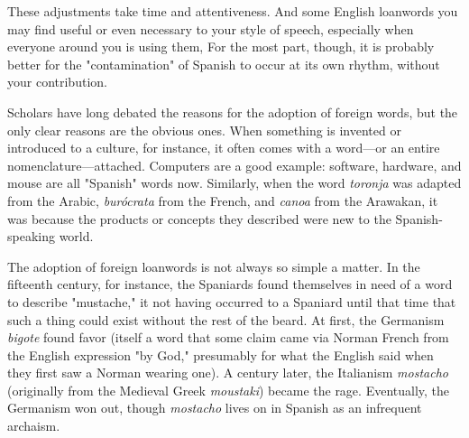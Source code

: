 These adjustments take time and attentiveness. And some English loanwords you may find useful or even necessary to your style
of speech, especially when everyone around you is using them, For
the most part, though, it is probably better for the "contamination" of
Spanish to occur at its own rhythm, without your contribution.

Scholars have long debated the reasons for the adoption of
foreign words, but the only clear reasons are the obvious ones. When
something is invented or introduced to a culture, for instance, it often
comes with a word---or an entire nomenclature---attached. Computers
are a good example: software, hardware, and mouse are all "Spanish"
words now. Similarly, when the word \emph{toronja} was adapted from the
Arabic, \emph{burócrata} from the French, and \emph{canoa} from the Arawakan, it
was because the products or concepts they described were new to the
Spanish-speaking world.

The adoption of foreign loanwords is not always so simple
a matter. In the fifteenth century, for instance, the Spaniards found
themselves in need of a word to describe "mustache," it not having occurred to a Spaniard until that time that such a thing could exist without the rest of the beard. At first, the Germanism \emph{bigote} found favor
(itself a word that some claim came via Norman French from the English expression "by God," presumably for what the English said when
they first saw a Norman wearing one). A century later, the Italianism
\emph{mostacho} (originally from the Medieval Greek \emph{moustaki}) became the
rage. Eventually, the Germanism won out, though \emph{mostacho} lives on
in Spanish as an infrequent archaism.


